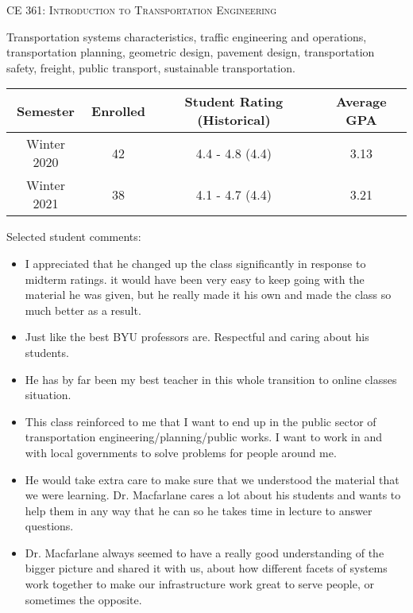 \documentclass[margin,line]{res}
\newif\ifdetail
\newcommand{\acc}{\scshape }
\begin{document}
\begin{resume}
\fi

\vspace{.4cm}
{\acc CE 361: Introduction to Transportation Engineering}

\vspace{-.4cm}
Transportation systems characteristics, traffic engineering and operations,
transportation planning, geometric design, pavement design, transportation
safety, freight, public transport, sustainable transportation.

\ifdetail
\begin{tabular}{cccc}
  \toprule
  Semester & Enrolled & Student Rating (Historical) & Average GPA\\
  \midrule
  Winter 2020 & 42 & 4.4 - 4.8 (4.4) & 3.13 \\
  Winter 2021 & 38 & 4.1 - 4.7 (4.4) & 3.21 \\
  \bottomrule

\end{tabular}

Selected student comments:
\begin{itemize}
  \item I appreciated that he changed up the class significantly in response to midterm
  ratings. it would have been very easy to keep going with the material he was
  given, but he really made it his own and made the class so much better as a
  result.
  \item Just like the best BYU professors are. Respectful and caring about his students.
  \item He has by far been my best teacher in this whole transition to online classes situation.
  \item This class reinforced to me that I want to end up in the public sector of
transportation engineering/planning/public works. I want to work in and with
local governments to solve problems for people around me.
  \item He would take extra care to make sure that we understood the material that we were learning. Dr. Macfarlane cares a lot about his students and wants to help them in any way that he can so he takes time in lecture to answer questions.
  \item Dr. Macfarlane always seemed to have a really good understanding of the bigger picture and shared it with us, about how different facets of systems work together to make our infrastructure work great to serve people, or sometimes the opposite.
\end{itemize}



\end{resume}
\end{document}
